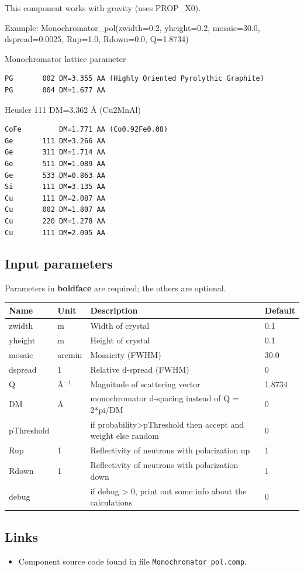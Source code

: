 This component works with gravity (uses PROP\_X0).

Example: Monochromator\_pol(zwidth=0.2, yheight=0.2, mosaic=30.0, dspread=0.0025, Rup=1.0, Rdown=0.0, Q=1.8734)

Monochromator lattice parameter

\begin{verbatim}
PG       002 DM=3.355 AA (Highly Oriented Pyrolythic Graphite)
PG       004 DM=1.677 AA
\end{verbatim}

Heusler 111 DM=3.362 \AA{} (Cu2MnAl)

\begin{verbatim}
CoFe         DM=1.771 AA (Co0.92Fe0.08)
Ge       111 DM=3.266 AA
Ge       311 DM=1.714 AA
Ge       511 DM=1.089 AA
Ge       533 DM=0.863 AA
Si       111 DM=3.135 AA
Cu       111 DM=2.087 AA
Cu       002 DM=1.807 AA
Cu       220 DM=1.278 AA
Cu       111 DM=2.095 AA
\end{verbatim}

\subsection*{Input parameters}
Parameters in \textbf{boldface} are required; the others are optional.

\begin{longtable}{p{}p{}p{}p{}}
\toprule
\textbf{Name} & \textbf{Unit} & \textbf{Description} & \textbf{Default} \\
\midrule
\endhead
zwidth & m & Width of crystal & 0.1 \\
yheight & m & Height of crystal & 0.1 \\
mosaic & arcmin & Mosaicity (FWHM) & 30.0 \\
dspread & 1 & Relative d-spread (FWHM) & 0 \\
Q & \AA{}$^{-1}$ & Magnitude of scattering vector & 1.8734 \\
DM & \AA{} & monochromator d-spacing instead of Q = 2*pi/DM & 0 \\
pThreshold &  & if probability\textgreater{}pThreshold then accept and weight else random & 0 \\
Rup & 1 & Reflectivity of neutrons with polarization up & 1 \\
Rdown & 1 & Reflectivity of neutrons with polarization down & 1 \\
debug &  & if debug \textgreater{} 0, print out some info about the calculations & 0 \\
\bottomrule
\end{longtable}

\subsection*{Links}
\begin{itemize}
  \item Component source code found in file \texttt{Monochromator\_pol.comp}.
\end{itemize}
